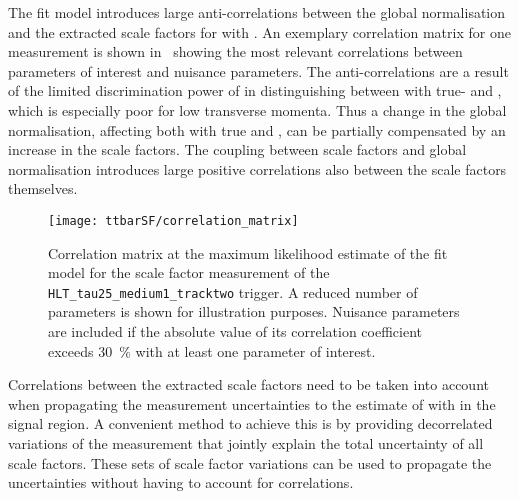 
The fit model introduces large anti-correlations between the global
\ttbar normalisation and the extracted scale factors for \ttbar with
\faketauhadvis. An exemplary correlation matrix for one measurement is
shown in~ showing the most relevant
correlations between parameters of interest and nuisance parameters.
The anti-correlations are a result of the limited discrimination power
of \mTW in distinguishing between \ttbar with true- and
\faketauhadvis, which is especially poor for low \tauhadvis transverse
momenta. Thus a change in the global \ttbar normalisation, affecting
both \ttbar with true and \faketauhadvis, can be partially compensated
by an increase in the \faketauhadvis scale factors. The coupling
between scale factors and global \ttbar normalisation introduces large
positive correlations also between the scale factors themselves.

\begin{figure}[htbp]
  \centering
  \texttt{[image: ttbarSF/correlation\_matrix]}

  \caption{Correlation matrix at the maximum likelihood estimate of
    the fit model for the scale factor measurement of the
    \texttt{HLT\_tau25\_medium1\_tracktwo} trigger. A reduced number
    of parameters is shown for illustration purposes. Nuisance
    parameters are included if the absolute value of its correlation
    coefficient exceeds \SI{30}{\percent} with at least one parameter
    of interest.}
  \label{fig:ttbarSF_corr_matrix}
\end{figure}

Correlations between the extracted scale factors need to be taken into
account when propagating the measurement uncertainties to the estimate
of \ttbar with \faketauhadvis in the \hadhad signal region. A
convenient method to achieve this is by providing decorrelated
variations of the measurement that jointly explain the total
uncertainty of all scale factors. These sets of scale factor
variations can be used to propagate the uncertainties without having
to account for correlations.

